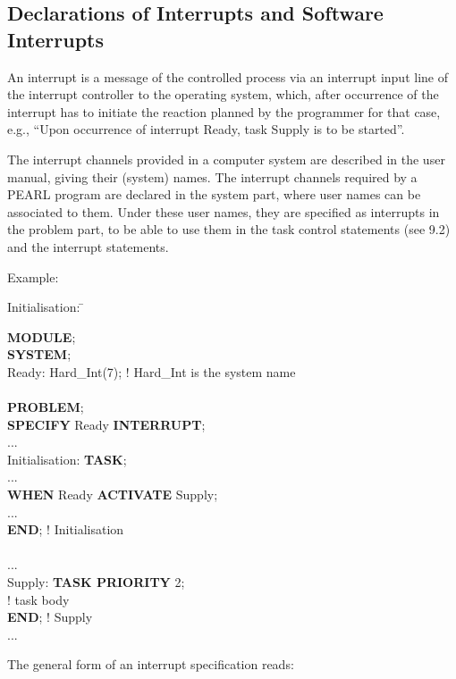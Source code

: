\subsection{Declarations of Interrupts and Software Interrupts}    %

An interrupt is a message of the controlled process via an interrupt
input line of the interrupt controller to the operating system, which,
after occurrence of the interrupt has to initiate the reaction planned
by the programmer for that case, e.g., ``Upon occurrence of interrupt
Ready, task Supply is to be started''.

The interrupt channels provided in a computer system are described in the
user manual, giving their (system) names. The interrupt channels required
by a PEARL program are declared in the system part, where user names can
be associated to them. Under these user names, they are specified as
interrupts in the problem part, to be able to use them in the task
control statements (see 9.2) and the interrupt statements.

Example:

\begin{tabbing}
Initialisation: \= \kill

{\bf MODULE}; \> \\
{\bf SYSTEM}; \> \\
\x Ready: Hard\_Int(7); ! Hard\_Int is the system name \> \\
   \> \\
{\bf PROBLEM}; \> \\
{\bf SPECIFY} Ready {\bf INTERRUPT}; \> \\
... \> \\
Initialisation: \> {\bf TASK}; \\
  \> ... \\
  \> {\bf WHEN} Ready {\bf ACTIVATE} Supply; \\
  \> ... \\
  \> {\bf END}; ! Initialisation \\
  \> \\
...             \> \\
Supply:         \> {\bf TASK PRIORITY} 2;\\
  \> ! task body \\
  \> {\bf END}; ! Supply \\
...             \>
\end{tabbing}

The general form of an interrupt specification reads:

